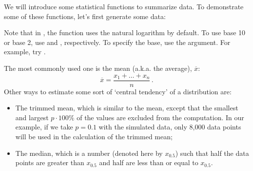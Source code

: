 
We will introduce some statistical functions to summarize data. To demonstrate some of these functions, let's first generate some data:

\begin{knitrout}
\color{fgcolor}\begin{kframe}
\begin{alltt}
 \hlkwb{<-} 
 \hlkwb{<-} 
 \hlkwb{<-} \hlopt{-}\hlstd{(}\hlopt{/}
\end{alltt}
\end{kframe}
\end{knitrout}

Note that in \R, the  function uses the natural logarithm by default. To use base 10 or base 2, use  and , respectively. To specify the base, use the  argument. For example, try  .

The most commonly used one is the mean (a.k.a. the average), $\overline{x}$:\\
$$\overline{x}=\frac{x_1+\ldots+x_n}{n}\,.$$
Other ways to estimate some sort of `central tendency' of a distribution are:
 \begin{itemize}
 \item The trimmed mean, which is similar to the mean, except that the smallest and largest $p\cdot 100\%$  of the values are excluded from the computation. In our example, if we take $p=0.1$ with the simulated data, only 8,000 data points will be used in the calculation of the trimmed mean; 
 \item The median, which is a number (denoted here by $x_{0.5}$) such that half the data points are greater than $x_{0.5}$ and half are less than or equal to $x_{0.5}$. 
 \end{itemize}

